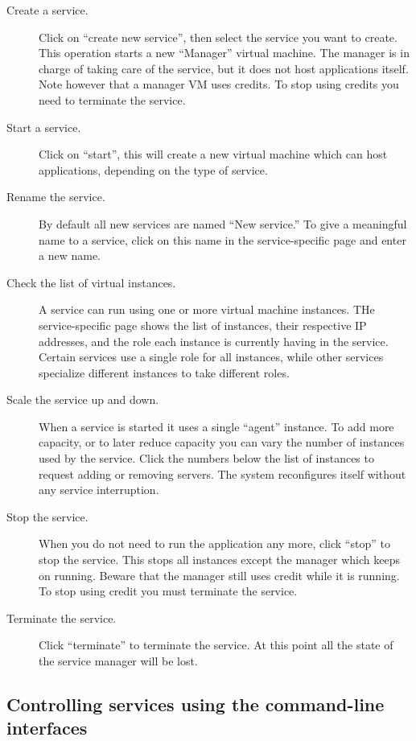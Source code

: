 \documentclass[10pt]{article}
\begin{document}
\begin{description}
\item[Create a service.] Click on ``create new service'', then select
  the service you want to create. This operation starts a new
  ``Manager'' virtual machine. The manager is in charge of taking care
  of the service, but it does not host applications itself. Note
  however that a manager VM uses credits. To stop using credits you
  need to terminate the service.
\item[Start a service.] Click on ``start'', this will create a new
  virtual machine which can host applications, depending on the type
  of service.
\item[Rename the service.] By default all new services are named ``New
  service.'' To give a meaningful name to a service, click on this
  name in the service-specific page and enter a new name.
\item[Check the list of virtual instances.] A service can run using
  one or more virtual machine instances. THe service-specific page
  shows the list of instances, their respective IP addresses, and the
  role each instance is currently having in the service. Certain
  services use a single role for all instances, while other services
  specialize different instances to take different roles.
\item[Scale the service up and down.] When a service is started it
  uses a single ``agent'' instance. To add more capacity, or to later
  reduce capacity you can vary the number of instances used by the
  service. Click the numbers below the list of instances to request
  adding or removing servers. The system reconfigures itself without
  any service interruption.
\item[Stop the service.] When you do not need to run the application
  any more, click ``stop'' to stop the service. This stops all
  instances except the manager which keeps on running. Beware that the
  manager still uses credit while it is running. To stop using credit
  you must terminate the service.
\item[Terminate the service.] Click ``terminate'' to terminate the
  service. At this point all the state of the service manager will be
  lost.
\end{description}

\subsection{Controlling services using the command-line interfaces}
\end{document}
